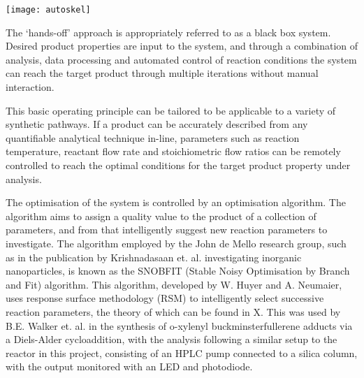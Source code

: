 \texttt{[image: autoskel]}

The ‘hands-off’ approach is appropriately referred to as a black box system. Desired product properties are input to the system, and through a combination of analysis, data processing and automated control of reaction conditions the system can reach the target product through multiple iterations without manual interaction.

This basic operating principle can be tailored to be applicable to a variety of synthetic pathways. If a product can be accurately described from any quantifiable analytical technique in-line, parameters such as reaction temperature, reactant flow rate and stoichiometric flow ratios can be remotely controlled to reach the optimal conditions for the target product property under analysis.

The optimisation of the system is controlled by an optimisation algorithm. The algorithm aims to assign a quality value to the product of a collection of parameters, and from that intelligently suggest new reaction parameters to investigate. The algorithm employed by the John de Mello research group, such as in the publication by Krishnadasaan et. al. investigating inorganic nanoparticles, is known as the SNOBFIT (Stable Noisy Optimisation by Branch and Fit) algorithm. This algorithm, developed by W. Huyer and A. Neumaier, uses response surface methodology (RSM) to intelligently select successive reaction parameters, the theory of which can be found in X. This was used by B.E. Walker et. al. in the synthesis of o-xylenyl buckminsterfullerene adducts via a Diels-Alder cycloaddition, with the analysis following a similar setup to the reactor in this project, consisting of an HPLC pump connected to a silica column, with the output monitored with an LED and photodiode.

